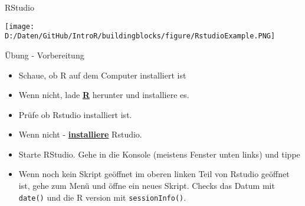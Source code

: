\documentclass[ignorenonframetext,]{beamer}
\begin{document}
\begin{frame}{RStudio}
\protect\hypertarget{rstudio}{}

\texttt{[image: D:/Daten/GitHub/IntroR/buildingblocks/figure/RstudioExample.PNG]}

\end{frame}

\begin{frame}[fragile]{Übung - Vorbereitung}
\protect\hypertarget{ubung---vorbereitung}{}

\begin{itemize}
\item
  Schaue, ob R auf dem Computer installiert ist
\item
  Wenn nicht, lade \href{r-project.org}{\textbf{R}} herunter und
  installiere es.
\item
  Prüfe ob Rstudio installiert ist.
\item
  Wenn nicht - \href{http://www.rstudio.com/}{\textbf{installiere}}
  Rstudio.
\item
  Starte RStudio. Gehe in die Konsole (meistens Fenster unten links) und
  tippe
\item
  Wenn noch kein Skript geöffnet im oberen linken Teil von Rstudio
  geöffnet ist, gehe zum Menü und öffne ein neues Skript. Checks das
  Datum mit \texttt{date()} und die R version mit
  \texttt{sessionInfo()}.
\end{itemize}

\end{frame}
\end{document}
